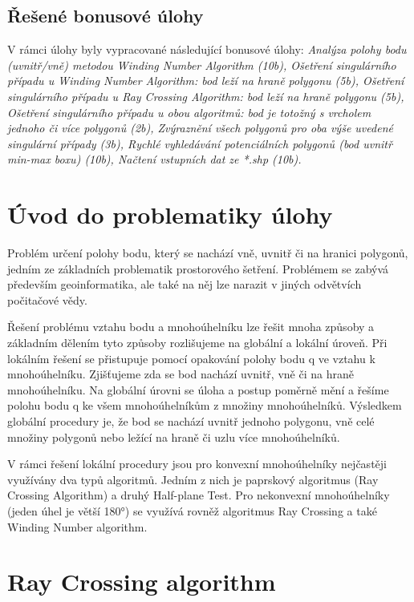 \documentclass[12pt, a4paper]{article}
\begin{document}
\subsection*{Řešené bonusové úlohy}
V rámci úlohy byly vypracované následující bonusové úlohy: \textit {Analýza polohy bodu (uvnitř/vně) metodou Winding Number Algorithm (10b), Ošetření singulárního případu u Winding Number Algorithm: bod leží na hraně polygonu (5b), Ošetření singulárního případu u Ray Crossing Algorithm: bod leží na hraně polygonu (5b), Ošetření singulárního případu u obou algoritmů: bod je totožný s vrcholem jednoho či více polygonů (2b), Zvýraznění všech polygonů pro oba výše uvedené singulární případy (3b), Rychlé vyhledávání potenciálních polygonů (bod uvnitř min-max boxu) (10b), Načtení vstupních dat ze *.shp (10b).}

\newpage
\section{Úvod do problematiky úlohy}
\vspace{5mm}
Problém určení polohy bodu, který se nachází vně, uvnitř či na hranici polygonů, jedním ze základních problematik prostorového šetření. Problémem se zabývá především geoinformatika, ale také na něj lze narazit v jiných odvětvích počitačové vědy. 
\vspace{3mm}

\noindent Řešení problému vztahu bodu a mnohoúhelníku lze řešit mnoha způsoby a základním dělením tyto způsoby rozlišujeme na globální a lokální úroveň. Při lokálním řešení se přistupuje pomocí opakování polohy bodu q ve vztahu k mnohoúhelníku. Zjišťujeme zda se bod nachází uvnitř, vně či na hraně mnohoúhelníku. Na globální úrovni se úloha a postup poměrně mění a řešíme polohu bodu q ke všem mnohoúhelníkům z množiny mnohoúhelníků. Výsledkem globální procedury je, že bod se nachází uvnitř jednoho polygonu, vně celé množiny polygonů nebo ležící na hraně či uzlu více mnohoúhelníků. 
\vspace{3mm}

\noindent V rámci řešení lokální procedury jsou pro konvexní mnohoúhelníky nejčastěji využívány dva typů algoritmů. Jedním z nich je paprskový algoritmus (Ray Crossing Algorithm) a druhý Half-plane Test. Pro nekonvexní mnohoúhelníky (jeden úhel je větší 180°) se využívá rovněž algoritmus Ray Crossing a také Winding Number algorithm.
\vspace{2cm}


\newpage
\section {Ray Crossing algorithm}
\vspace{5mm}
\end{document}
